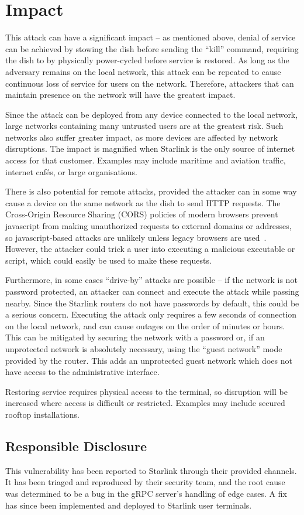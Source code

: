 \section{Impact}\label{sec:impact}

This attack can have a significant impact -- as mentioned above, denial of service can be achieved by stowing the dish before sending the ``kill'' command, requiring the dish to by physically power-cycled before service is restored.
As long as the adversary remains on the local network, this attack can be repeated to cause continuous loss of service for users on the network.
Therefore, attackers that can maintain presence on the network will have the greatest impact.

Since the attack can be deployed from any device connected to the local network, large networks containing many untrusted users are at the greatest risk.
Such networks also suffer greater impact, as more devices are affected by network disruptions.
The impact is magnified when Starlink is the only source of internet access for that customer.
Examples may include maritime and aviation traffic, internet cafés, or large organisations.

There is also potential for remote attacks, provided the attacker can in some way cause a device on the same network as the dish to send HTTP requests.
The Cross-Origin Resource Sharing (CORS) policies of modern browsers prevent javascript from making unauthorized requests to external domains or addresses, so javascript-based attacks are unlikely unless legacy browsers are used~\cite{cors}.
However, the attacker could trick a user into executing a malicious executable or script, which could easily be used to make these requests.

Furthermore, in some cases ``drive-by'' attacks are possible -- if the network is not password protected, an attacker can connect and execute the attack while passing nearby.
Since the Starlink routers do not have passwords by default, this could be a serious concern.
Executing the attack only requires a few seconds of connection on the local network, and can cause outages on the order of minutes or hours.
This can be mitigated by securing the network with a password or, if an unprotected network is absolutely necessary, using the ``guest network'' mode provided by the router.
This adds an unprotected guest network which does not have access to the administrative interface.

Restoring service requires physical access to the terminal, so disruption will be increased where access is difficult or restricted.
Examples may include secured rooftop installations.


\subsection{Responsible Disclosure}\label{sec:responsible-disclosure}

This vulnerability has been reported to Starlink through their provided channels.
It has been triaged and reproduced by their security team, and the root cause was determined to be a bug in the gRPC server's handling of edge cases.
A fix has since been implemented and deployed to Starlink user terminals.
